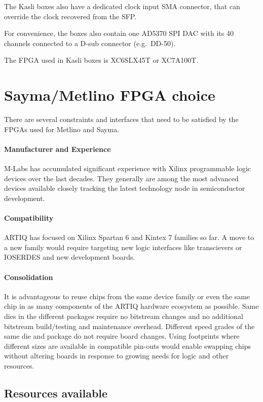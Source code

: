 \documentclass[11pt]{paper}
\begin{document}
The Kasli boxes also have a dedicated clock input SMA connector, that can override the clock recovered from the SFP.

For convenience, the boxes also contain one AD5370 SPI DAC with its 40 channels connected to a D-sub connector (e.g.\ DD-50).

The FPGA used in Kasli boxes is XC6SLX45T or XC7A100T.

\section{Sayma/Metlino FPGA choice}

There are several constraints and interfaces that need to be satisfied by the FPGAs used for Metlino and Sayma.

\paragraph{Manufacturer and Experience} M-Labs has accumulated significant experience with Xilinx programmable logic devices over the last decades.
They generally are among the most advanced devices available closely tracking the latest technology node in semiconductor development.

\paragraph{Compatibility} ARTIQ has focused on Xilinx Spartan 6 and Kintex 7 families so far.
A move to a new family would require targeting new logic interfaces like transcievers or IOSERDES and new development boards.

\paragraph{Consolidation} It is advantageous to reuse chips from the same device family or even the same chip in as many components of the ARTIQ hardware ecosystem as possible.
Same dies in the different packages require no bitstream changes and no additional bitstream build/testing and maintenance overhead.
Different speed grades of the same die and package do not require board
changes.
Using footprints where different sizes are available in compatible pin-outs would enable swapping chips without altering boards in response to growing needs for logic and other resources.

\subsection{Resources available}
\end{document}
